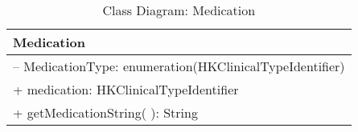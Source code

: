 \begin{table}[ht]
\centering
\caption{Class Diagram: Medication}

\hspace{1em}
\renewcommand{\arraystretch}{1.7}

\begin{tabular}{|l|}
\hline
\textbf{Medication} \\
\hline
– MedicationType: enumeration(HKClinicalTypeIdentifier) \\
+ medication: HKClinicalTypeIdentifier \\
\hdashline
+ getMedicationString( ): String \\
\hline
\end{tabular}
\end{table}
